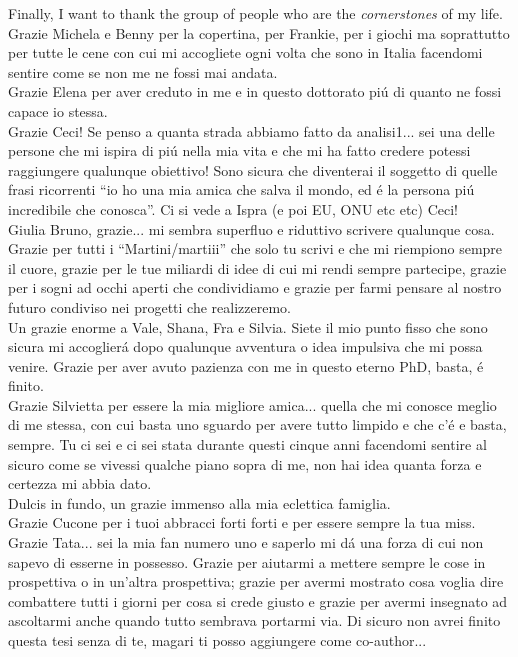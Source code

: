 \begin{acknowledgements}
Finally, I want to thank the group of people who are the \emph{cornerstones} of my life. \\
Grazie Michela e Benny per la copertina, per Frankie, per i giochi ma soprattutto per tutte le cene con cui mi accogliete ogni volta che sono in Italia facendomi sentire come se non me ne fossi mai andata. \\
Grazie Elena per aver creduto in me e in questo dottorato pi\'u di quanto ne fossi capace io stessa. \\
Grazie Ceci! Se penso a quanta strada abbiamo fatto da analisi1... sei una delle persone che mi ispira di pi\'u nella mia vita e che mi ha fatto credere potessi raggiungere qualunque obiettivo! Sono sicura che diventerai il soggetto di quelle frasi ricorrenti ``io ho una mia amica che salva il mondo, ed \'e la persona pi\'u incredibile che conosca''. Ci si vede a Ispra (e poi EU, ONU etc etc) Ceci!\\
Giulia Bruno, grazie... mi sembra superfluo e riduttivo scrivere qualunque cosa. Grazie per tutti i ``Martini/martiii'' che solo tu scrivi e che mi riempiono sempre il cuore, grazie per le tue miliardi di idee di cui mi rendi sempre partecipe, grazie per i sogni ad occhi aperti che condividiamo e grazie per farmi pensare al nostro futuro condiviso nei progetti che realizzeremo. \\
Un grazie enorme a Vale, Shana, Fra e Silvia. Siete il mio punto fisso che sono sicura mi accoglier\'a dopo qualunque avventura o idea impulsiva che mi possa venire. Grazie per aver avuto pazienza con me in questo eterno PhD, basta, \'e finito. \\
Grazie Silvietta per essere la mia migliore amica... quella che mi conosce meglio di me stessa, con cui basta uno sguardo per avere tutto limpido e che c'\'e e basta, sempre. Tu ci sei e ci sei stata durante questi cinque anni facendomi sentire al sicuro come se vivessi qualche piano sopra di me, non hai idea quanta forza e certezza mi abbia dato.\\
Dulcis in fundo, un grazie immenso alla mia eclettica famiglia.\\
Grazie Cucone per i tuoi abbracci forti forti e per essere sempre la tua miss.\\
Grazie Tata... sei la mia fan numero uno e saperlo mi d\'a una forza di cui non sapevo di esserne in possesso. Grazie per aiutarmi a mettere sempre le cose in prospettiva o in un'altra prospettiva; grazie per avermi mostrato cosa voglia dire combattere tutti i giorni per cosa si crede giusto e grazie per avermi insegnato ad ascoltarmi anche quando tutto sembrava portarmi via. Di sicuro non avrei finito questa tesi senza di te, magari ti posso aggiungere come co-author... \\

\end{acknowledgements}
